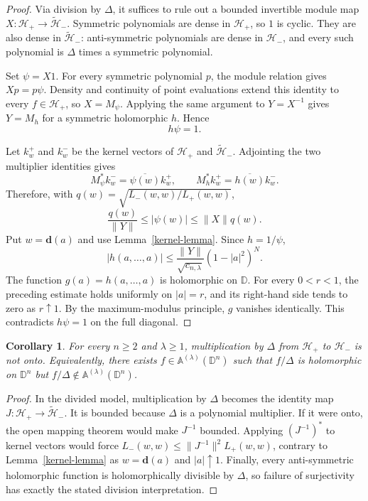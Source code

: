 \documentclass[11pt]{article}
\newtheorem{corollary}[theorem]{Corollary}
\newcommand{\D}{\mathbb D}
\newcommand{\cH}{\mathcal H}
\newcommand{\diagpt}[1]{\boldsymbol d(#1)}
\begin{document}
\begin{proof}
Via division by $\Delta$, it suffices to rule out a bounded invertible module
map $X:\cH_+\to\widetilde{\cH}_-$.  Symmetric polynomials are dense in
$\cH_+$, so $1$ is cyclic.  They are also dense in
$\widetilde{\cH}_-$: anti-symmetric polynomials are dense in $\cH_-$, and
every such polynomial is $\Delta$ times a symmetric polynomial.

Set $\psi=X1$.  For every symmetric polynomial $p$, the module relation gives
$Xp=p\psi$.  Density and continuity of point evaluations extend this identity
to every $f\in\cH_+$, so $X=M_\psi$.  Applying the same argument to
$Y=X^{-1}$ gives $Y=M_h$ for a symmetric holomorphic $h$.  Hence
\[
 h\psi=1.
\]

Let $k_w^+$ and $k_w^-$ be the kernel vectors of $\cH_+$ and
$\widetilde{\cH}_-$.  Adjointing the two multiplier identities gives
\[
 M_\psi^*k_w^-=\overline{\psi(w)}k_w^+,
 \qquad
 M_h^*k_w^+=\overline{h(w)}k_w^-.
\]
Therefore, with
$q(w)=\sqrt{L_-(w,w)/L_+(w,w)}$,
\[
 \frac{q(w)}{\|Y\|}\leq |\psi(w)|\leq \|X\|q(w).
\]
Put $w=\diagpt a$ and use Lemma~\ref{kernel-lemma}.  Since $h=1/\psi$,
\[
 |h(a,\ldots,a)|
 \leq \frac{\|Y\|}{\sqrt{c_{n,\lambda}}}(1-|a|^2)^N.
\]
The function $g(a)=h(a,\ldots,a)$ is holomorphic on $\D$.  For every
$0<r<1$, the preceding estimate holds uniformly on $|a|=r$, and its
right-hand side tends to zero as $r\uparrow1$.  By the maximum-modulus
principle, $g$ vanishes identically.  This contradicts $h\psi=1$ on the full
diagonal.
\end{proof}

\begin{corollary}\label{division-corollary}
For every $n\geq2$ and $\lambda\geq1$, multiplication by $\Delta$ from
$\cH_+$ to $\cH_-$ is not onto.  Equivalently, there exists
$f\in\mathbb A^{(\lambda)}(\D^n)$ such that $f/\Delta$ is holomorphic on
$\D^n$ but $f/\Delta\notin\mathbb A^{(\lambda)}(\D^n)$.
\end{corollary}

\begin{proof}
In the divided model, multiplication by $\Delta$ becomes the identity map
$J:\cH_+\to\widetilde{\cH}_-$.  It is bounded because $\Delta$ is a
polynomial multiplier.  If it were onto, the open mapping theorem would make
$J^{-1}$ bounded.  Applying $(J^{-1})^*$ to kernel vectors would force
$L_-(w,w)\leq\|J^{-1}\|^2L_+(w,w)$, contrary to Lemma~\ref{kernel-lemma}
as $w=\diagpt a$ and $|a|\uparrow1$.  Finally, every anti-symmetric
holomorphic function is holomorphically divisible by $\Delta$, so failure of
surjectivity has exactly the stated division interpretation.
\end{proof}
\end{document}
